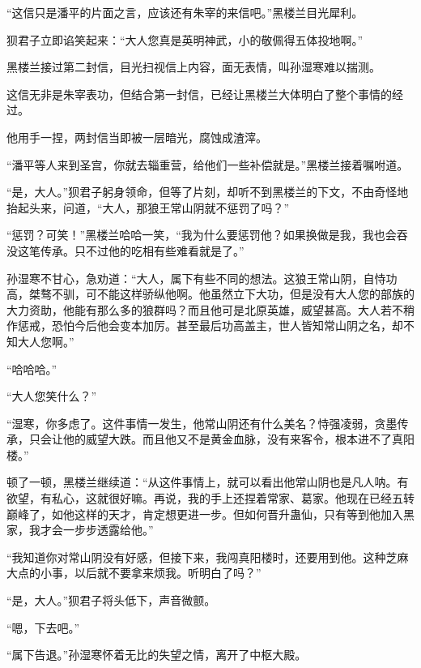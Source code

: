 \begin{this_body}
“这信只是潘平的片面之言，应该还有朱宰的来信吧。”黑楼兰目光犀利。

狈君子立即谄笑起来：“大人您真是英明神武，小的敬佩得五体投地啊。”

黑楼兰接过第二封信，目光扫视信上内容，面无表情，叫孙湿寒难以揣测。

这信无非是朱宰表功，但结合第一封信，已经让黑楼兰大体明白了整个事情的经过。

他用手一捏，两封信当即被一层暗光，腐蚀成渣滓。

“潘平等人来到圣宫，你就去辎重营，给他们一些补偿就是。”黑楼兰接着嘱咐道。

“是，大人。”狈君子躬身领命，但等了片刻，却听不到黑楼兰的下文，不由奇怪地抬起头来，问道，“大人，那狼王常山阴就不惩罚了吗？”

“惩罚？可笑！”黑楼兰哈哈一笑，“我为什么要惩罚他？如果换做是我，我也会吞没这笔传承。只不过他的吃相有些难看就是了。”

孙湿寒不甘心，急劝道：“大人，属下有些不同的想法。这狼王常山阴，自恃功高，桀骜不驯，可不能这样骄纵他啊。他虽然立下大功，但是没有大人您的部族的大力资助，他能有那么多的狼群吗？而且他可是北原英雄，威望甚高。大人若不稍作惩戒，恐怕今后他会变本加厉。甚至最后功高盖主，世人皆知常山阴之名，却不知大人您啊。”

“哈哈哈。”

“大人您笑什么？”

“湿寒，你多虑了。这件事情一发生，他常山阴还有什么美名？恃强凌弱，贪墨传承，只会让他的威望大跌。而且他又不是黄金血脉，没有来客令，根本进不了真阳楼。”

顿了一顿，黑楼兰继续道：“从这件事情上，就可以看出他常山阴也是凡人呐。有欲望，有私心，这就很好嘛。再说，我的手上还捏着常家、葛家。他现在已经五转巅峰了，如他这样的天才，肯定想更进一步。但如何晋升蛊仙，只有等到他加入黑家，我才会一步步透露给他。”

“我知道你对常山阴没有好感，但接下来，我闯真阳楼时，还要用到他。这种芝麻大点的小事，以后就不要拿来烦我。听明白了吗？”

“是，大人。”狈君子将头低下，声音微颤。

“嗯，下去吧。”

“属下告退。”孙湿寒怀着无比的失望之情，离开了中枢大殿。

\end{this_body}

